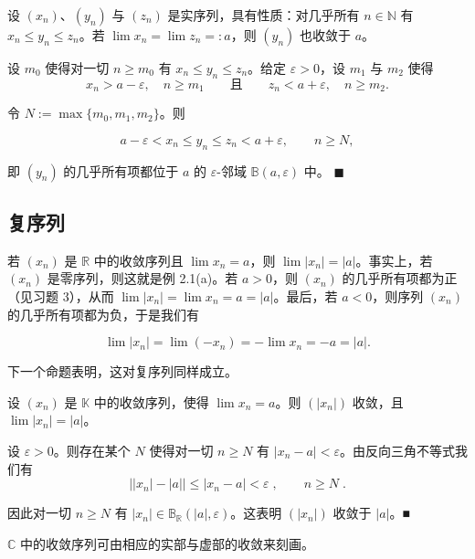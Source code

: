 \begin{proposition}

设 $(x_n)$、$(y_n)$ 与 $(z_n)$ 是实序列，具有性质：对几乎所有 $n \in \mathbb{N}$ 有 $x_n \leq y_n \leq z_n$。若 $\lim x_n = \lim z_n =: a$，则 $(y_n)$ 也收敛于 $a$。

\proofhead
设 $ m_0 $ 使得对一切 $ n \geq m_0 $ 有 $ x_n \leq y_n \leq z_n $。给定 $ \varepsilon > 0 $，设 $ m_1 $ 与 $ m_2 $ 使得
\[
x_{n}>a-\varepsilon,\quad n\geq m_{1}\qquad\text{且}\qquad z_{n}<a+\varepsilon,\quad n\geq m_{2}.
\]

令 $N := \max\{m_0, m_1, m_2\}$。则

\[
a-\varepsilon<x_{n}\leq y_{n}\leq z_{n}<a+\varepsilon,\qquad n\geq N,
\]

即 $ (y_{n}) $ 的几乎所有项都位于 $ a $ 的 $ \varepsilon $-邻域 $ \mathbb{B}(a,\varepsilon) $ 中。  $ \blacksquare $

\end{proposition}

\subsection*{复序列}

若 $(x_n)$ 是 $\mathbb{R}$ 中的收敛序列且 $\lim x_n = a$，则 $\lim |x_n| = |a|$。事实上，若 $(x_n)$ 是零序列，则这就是例 2.1(a)。若 $a > 0$，则 $(x_n)$ 的几乎所有项都为正（见习题 3），从而 $\lim |x_n| = \lim x_n = a = |a|$。最后，若 $a < 0$，则序列 $(x_n)$ 的几乎所有项都为负，于是我们有

\[
\lim\left|x_{n}\right|=\lim(-x_{n})=-\lim x_{n}=-a=\left|a\right|.
\]

下一个命题表明，这对复序列同样成立。

\begin{proposition}

设 $ (x_n) $ 是 $ \mathbb{K} $ 中的收敛序列，使得 $ \lim x_n = a $。则 $ (|x_n|) $ 收敛，且 $ \lim |x_n| = |a| $。

\proofhead
设 $ \varepsilon > 0 $。则存在某个 $ N $ 使得对一切 $ n \geq N $ 有 $ |x_n - a| < \varepsilon $。由反向三角不等式我们有
\[
\left||x_{n}|-|a|\right|\leq|x_{n}-a|<\varepsilon\;,\qquad n\geq N\;.
\]

因此对一切 $ n \geq N $ 有 $ |x_n| \in \mathbb{B}_{\mathbb{R}}(|a|, \varepsilon) $。这表明 $ (|x_n|) $ 收敛于 $ |a| $。■

\end{proposition}

$ \mathbb{C} $ 中的收敛序列可由相应的实部与虚部的收敛来刻画。

